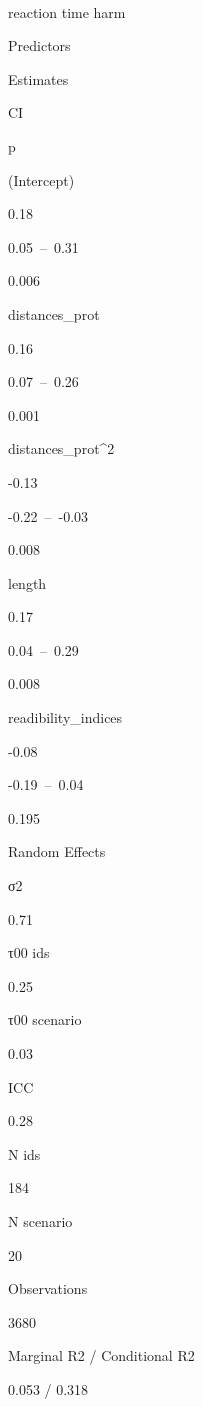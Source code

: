 \documentclass[]{article}
\begin{document}
~

reaction time harm

Predictors

Estimates

CI

p

(Intercept)

0.18

0.05~--~0.31

0.006

distances\_prot

0.16

0.07~--~0.26

0.001

distances\_prot\^{}2

-0.13

-0.22~--~-0.03

0.008

length

0.17

0.04~--~0.29

0.008

readibility\_indices

-0.08

-0.19~--~0.04

0.195

Random Effects

σ2

0.71

τ00 ids

0.25

τ00 scenario

0.03

ICC

0.28

N ids

184

N scenario

20

Observations

3680

Marginal R2 / Conditional R2

0.053 / 0.318
\end{document}
